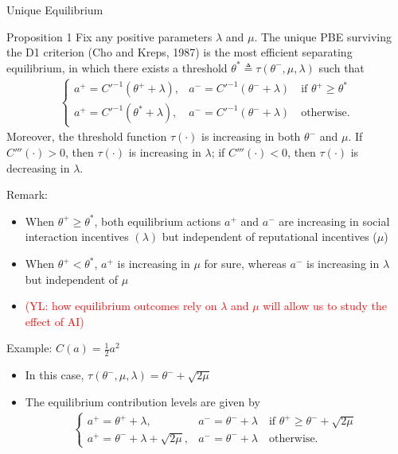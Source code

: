 \documentclass[9pt,aspectratio=1610]{beamer}
\begin{document}
\begin{frame}{Unique Equilibrium}\label{prop1}
\begin{exampleblock}{Proposition 1}
    Fix any positive parameters $\lambda$ and $\mu$. The unique PBE surviving the D1 criterion (Cho and Kreps, 1987) is the most efficient separating equilibrium, in which there exists a threshold $\theta^*\triangleq\tau(\theta^-,\mu,\lambda)$ such that
    \begin{align*}
    \begin{cases}
        a^+ = C'^{-1}(\theta^++\lambda), &a^- = C'^{-1}(\theta^-+\lambda)  \quad\text{if } \theta^+\geq \theta^*\\ 
        a^+ = C'^{-1}(\theta^*+\lambda), &a^- = C'^{-1}(\theta^-+\lambda)     \quad\text{otherwise.}
    \end{cases}
    \end{align*}
    Moreover, the threshold function $\tau(\cdot)$ is increasing in both $\theta^-$ and $\mu$. If $C'''(\cdot)>0$, then $\tau(\cdot)$ is increasing in $\lambda$; if $C'''(\cdot)<0$, then $\tau(\cdot)$ is decreasing in $\lambda$.
\end{exampleblock}
\vspace{1em}

Remark:
\begin{itemize}\setlength{\itemsep}{.5em}
    \item When $\theta^+\geq \theta^*$, both equilibrium actions $a^+$ and $a^-$ are increasing in social interaction incentives $(\lambda)$ but independent of reputational incentives ($\mu$)
    \item When $\theta^+<\theta^*$, $a^+$ is increasing in $\mu$ for sure, whereas $a^-$ is increasing in $\lambda$ but independent of $\mu$
    \item \textcolor{red}{(YL: how equilibrium outcomes rely on $\lambda$ and $\mu$ will allow us to study the effect of AI)}
\end{itemize}

\vspace{.5em}
\hyperlink{proof_prop1}{}

\end{frame}


\begin{frame}{Example: $C(a) = \frac{1}{2}a^2$}

\begin{itemize}\setlength{\itemsep}{1em}
    \item In this case, $\tau(\theta^-,\mu,\lambda) = \theta^- + \sqrt{2\mu}$
    \item The equilibrium contribution levels are given by
    \begin{align*}
    \begin{cases}
        a^+ = \theta^++\lambda,  &a^- = \theta^-+\lambda  \quad\text{if } \theta^+\geq \theta^-+\sqrt{2\mu} \\
        a^+ = \theta^-+\lambda+\sqrt{2\mu}, &a^- =  \theta^-+\lambda  \quad \text{otherwise.}
    \end{cases}
    \end{align*}
\end{itemize}
\end{frame}
\end{document}
